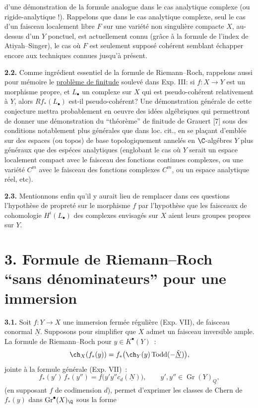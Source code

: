 
d'une
démonstration de la formule analogue dans le cas analytique complexe (ou rigide-analytique !). Rappelons que dans le cas analytique complexe, seul le cas d'un faisceau localement libre $F$ sur une variété non singulière compacte $X$, au-dessus d'un $Y$ ponctuel, est actuellement connu (grâce à la formule de l'index de Atiyah--Singer), le cas où $F$ est seulement supposé cohérent semblant échapper encore aux techniques connues jusqu'à présent.

\textbf{2.2.} Comme ingrédient essentiel de la formule de Riemann--Roch, rappelons aussi pour mémoire le \uline{problème de finitude} soulevé dans Exp. III: si $f:X\to Y$ est un morphisme propre, et $L_\bullet$ un complexe sur $X$ qui est pseudo-cohérent relativement à $Y$, alors $Rf_*(L_\bullet)$ est-il pseudo-cohérent? Une démonstration générale de cette conjecture mettra probablement en oeuvre des idées algébriques qui permettront de donner une démonstration du ``théorème'' de finitude de Grauert [7] sous des conditions notablement plus générales que dans loc. cit., en se plaçant d'emblée sur des espaces (ou topos) de base topologiquement annelés en $\C$-algébres $Y$ plus généraux que des espéces analytiques (englobant le cas où $Y$ serait un espace localement compact avec le faisceau des fonctions continues complexes, ou une variété $C^m$ avec le faisceau des fonctions complexes $C^m$, ou un espace analytique réel, etc).

\textbf{2.3.} Mentionnons enfin qu'il y aurait lieu de remplacer dans ces questions l'hypothèse de propreté sur le morphisme $f$ par l'hypothèse que les faisceaux de cohomologie $H^i(L_\bullet)$ des complexes envisagés sur $X$ aient leurs groupes propres sur $Y$.

\section*{3. Formule de Riemann--Roch ``sans dénominateurs'' pour une immersion}

\textbf{3.1.} Soit $f:Y\to X$ une immersion fermée régulière (Exp. VII), de faisceau conormal $\underline N$. Supposons pour simplifier que $X$ admet un faisceau inversible ample. La formule de Riemann--Roch pour $y\in K^\bullet(Y)$~:
\[
 \ch_X(f_*(y))=f_*\bigl(\ch_Y(y)\operatorname{Todd}(-\check{\underline N})\bigr),
\]
jointe à la formule générale (Exp. VII)~:
\[
 f_*(y')\,f_*(y'')=f\bigl(y'y''c_d(\underline N)\bigr),\qquad y',y''\in \operatorname{Gr}(Y)_{\underline Q},
\]
(en supposant $f$ de codimension $d$), permet d'exprimer les classes de Chern de $f_*(y)$ dans $\operatorname{Gr}^\bullet(X)_\Q$ sous la forme
